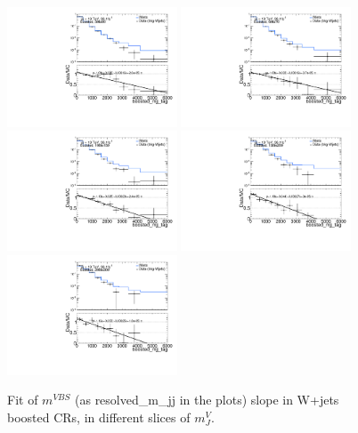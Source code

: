 \begin{figure}[!ht]
	\centering
	\includegraphics[width=0.45\textwidth]{Chapter5/2para_50to60.pdf}
	\includegraphics[width=0.45\textwidth]{Chapter5/2para_60to70.pdf}
	\includegraphics[width=0.45\textwidth]{Chapter5/2para_100to150.pdf}
	\includegraphics[width=0.45\textwidth]{Chapter5/2para_150to200.pdf}
	\includegraphics[width=0.45\textwidth]{Chapter5/2para_200to300.pdf}
	\caption{\label{Fig:mjj_dataMC_fit_boosted} Fit of $m^{VBS}$ (as resolved\_m\_jj in the plots) slope in W+jets boosted CRs, in different slices of $m^{V}_{J}$. }
\end{figure}

